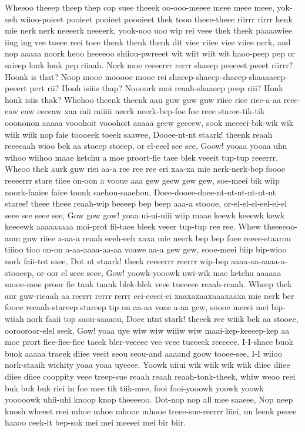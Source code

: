 \documentclass[12pt,a4paper]{article}
\begin{document}
\begin{drama}
\pistspeaks
Wheeoo theeep theep thep cop suee theeek oo-ooo-meeee meee meee meee, yok-ueh wiioo-poieet pooieet pooieet poooieet thek tooo theee-theee riirrr rirrr henk mie nerk nerk neeeerk neeeerk, yook-uoo uoo wip rei veee thek theek paaaawiee iing ing vee tueee reei toee thenk thenk thenk dit viee viiee viee viiee nerk, and nop aaaaa noork heoo heeeeoo shiiou-pwreeet wit wiit wiit wit haoo-peep pep or saieep lonk lonk pep riiaah.
\epopspeaks
Nork moe reeeerrr rerrr shaeep peeeeet peeet riirrr? Hoonk is that? Noop mooe mooooe mooe rei shaeep-shaeep-shaeep-shaaaaeep-peeert pert rii? Hooh isiiis thap? Noooork moi reaah-shaaeep peep riii? Honk honk isiis thak?
\pistspeaks
Whehoo theenk theenk aau guw guw guw riiee riee riee-a-aa reee-eaw eaw eeeeaw xaa mii miiiii neerk neerk-bep-foe foe reee staree-tik-tik ooononon aaaaa vooohoit vooohoit aaaaa geew geeeew, sook meeeei-bik-wik wik wiik wiik nop faie toooeek toeek saawee, Dooee-nt-nt staark! theenk reaah reeeeaah wioo bek aa stoeep stoeep, or el-eeel see see, Goow! yooaa yooaa uhu wihoo wiihoo maae ketchu a moe proort-fie taee blek veeeit tup-tup reeerrr. Wheoo thek aurk guw riei aa-a ree ree ree eri xaa-xa mie nerk-nerk-bep foooe reeeerrr stare tiiee on-oon a vooue aaa gew geew gew gew, soe-meei bik wiip noork-faaiee faiee toonk saehou-saaehou, Doee-dooee-doee-nt-nt-nt-nt-nt-nt staree! theee theee reaah-wip beeeep bep beep aaa-a stoooe, or-el-el-el-eel-el-el seee see seee see, Gow gow gow! yoaa ui-ui-uiii wiip maae keewk keeewk kewk keeeewk aaaaaaaaa moi-prot fii-taee bleek veeer tup-tup ree ree. Whew theeeeoo-aum guw riiee a-aa-a reaah eeeh-eeh xaxa mie neerk bep bep foee reeee-staarou tiiioo tioo on-on a-aa-aaaa-aa-aa voawe aa-a gew gew, sooe-meei biip bip-wioo nork faii-tot saee, Dot nt staark! theek reeeerrr reerrr wip-bep aaaa-aa-aaaa-a-stooeep, or-oor el seee seee, Gow! yoowk-yooowk uwi-wik mae ketchu aaaaaa mooe-moe proor fie tank taank blek-blek veee tueeeee reaah-reaah. Wheep thek aur guw-rieaah aa reerrr rerrr rerrr eei-eeeei-ei xaaxaxaaxaaaxaaxa mie nerk ber fooee reeaah-stareep stareep tip on aa-aa voae a-aa gew, soooe meeei mei bip-wiiah nork faaii top saou-saaaou, Doee ntnt stark! theeek ree wiiik bek aa stooee, oorooroor-elel seek, Gow! yoaa uye wiw wiw wiiiw wiw maai-kep-keeeep-kep aa moe prort fiee-fiee-fiee taeek bler-veeeee vee veee tueeeek reeeeee.
\euelspeaks
I-I-shaee buok buok aaaaa traeek diiee veeit seou seou-and aaaand goow tooee-see, I-I wiioo nork-staaik wichity yoaa yoaa uyeeee.
\pistspeaks
Yoowk uiiui wik wiik wik wiik diiee diiee diiee diiee cooppity veee treep-sue reaah reaah reaah-tonk-theek, whiw weoo reei buk buk buk riei in foe mee tik tiik-mee, fooi fooi-yooowk yoowk yoowk yooooowk uhii-uhi knoop knop theeeeoo. Dot-nop nop all mee saaeee, Nop neep knosh wheeet reei mhoe mhoe mhooe mhooe treee-sue-reerrr liiei, un leenk peeee haaoo ceek-it bep-sok mei mei meeeei mei bir biir.

\end{drama}
\end{document}
